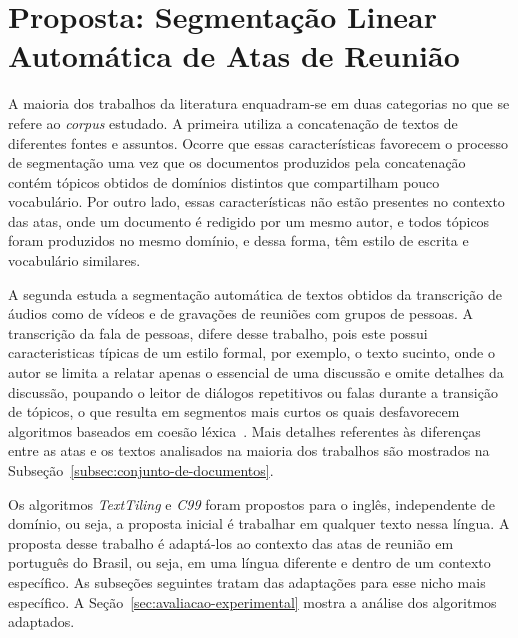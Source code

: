 \section{Proposta: Segmentação Linear Automática de Atas de Reunião}
	\label{sec:proposta}



A maioria dos trabalhos da literatura enquadram-se em duas categorias no que se refere ao \textit{corpus} estudado. A primeira utiliza a concatenação de textos de diferentes fontes e assuntos. 
Ocorre que essas características favorecem o processo de segmentação uma vez que os documentos produzidos pela concatenação contém tópicos obtidos de domínios distintos que compartilham pouco vocabulário. Por outro lado, essas características não estão presentes no contexto das atas, onde um documento é redigido por um mesmo autor, e todos tópicos foram produzidos no mesmo domínio, e dessa forma, têm estilo de escrita e vocabulário similares.


A segunda estuda a segmentação automática de textos obtidos da transcrição de áudios como de vídeos e de gravações de reuniões com grupos de pessoas. 
A transcrição da fala de pessoas, difere desse trabalho, pois este possui caracteristicas típicas de um estilo formal, por exemplo, o texto sucinto, onde o autor se limita a relatar apenas o essencial de uma discussão e omite detalhes da discussão, poupando o leitor de diálogos repetitivos ou falas durante a transição de tópicos, o que resulta em segmentos mais curtos os quais desfavorecem algoritmos baseados em coesão léxica~\cite{Choi2000}. 
Mais detalhes referentes às diferenças entre as atas e os textos analisados na maioria dos trabalhos são mostrados na Subseção~\ref{subsec:conjunto-de-documentos}.








Os algoritmos \textit{TextTiling} e \textit{C99} foram propostos para o inglês, independente de domínio, ou seja, a proposta inicial é trabalhar em qualquer texto nessa língua.
A proposta desse trabalho é adaptá-los ao contexto das atas de reunião em português do Brasil, ou seja, em uma língua diferente e dentro de um contexto específico. As subseções seguintes tratam das adaptações para esse nicho mais específico. A Seção~\ref{sec:avaliacao-experimental} mostra a análise dos algoritmos adaptados.

